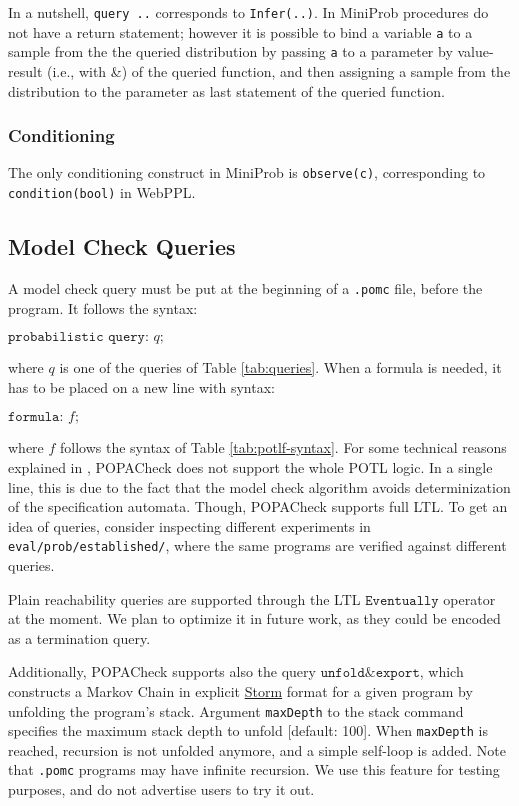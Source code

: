 \documentclass[9pt,a4paper]{article}
\begin{document}
In a nutshell, \texttt{query ..} corresponds to \texttt{Infer(..)}. In MiniProb procedures do not 
have a return statement; however it is possible to bind a variable \texttt{a} to a sample from the the queried distribution
by passing \texttt{a} to a parameter by value-result (i.e., with \&) of the queried function, 
and then assigning a sample from the distribution to the parameter as last statement of the queried function.

\subsubsection{Conditioning}
The only conditioning construct in MiniProb is \texttt{observe(c)}, corresponding to \texttt{condition(bool)} in WebPPL.

\subsection{Model Check Queries}
\label{sec:queries}
A model check query must be put at the beginning of a \verb|.pomc| file, before the program. It follows the syntax: 
\begin{center}
    $\texttt{probabilistic query:} \, \, q \texttt{;}$
\end{center}
where $q$ is one of the queries of Table \ref{tab:queries}. When a formula is needed, it has to be placed on a new line with syntax:
\begin{center}
    $\texttt{formula:} \, \, f \texttt{;}$
\end{center}
where $f$ follows the syntax of Table \ref{tab:potlf-syntax}. For some technical reasons explained in \cite{abs-2404-03515}, POPACheck does not support the whole POTL logic. In a single line, this is due to the fact that the model check algorithm avoids determinization of the specification automata. Though, POPACheck supports full LTL. To get an idea of queries, consider inspecting different experiments in \verb|eval/prob/established/|, where the same programs are verified against different queries.

Plain reachability queries are supported through the LTL $\texttt{Eventually}$ operator at the moment. We plan to optimize it in future work, as they could be encoded as a termination query. 

Additionally, POPACheck supports also the query $\texttt{unfold\&export}$, which constructs a Markov Chain in explicit \href{https://www.stormchecker.org/documentation/background/languages.html}{Storm} format for a given program by unfolding the program's stack. Argument \verb|maxDepth| to the stack command specifies the maximum stack depth to unfold [default: 100]. When \verb|maxDepth| is reached, recursion is not unfolded anymore, and a simple self-loop is added. Note that \verb|.pomc| programs may have infinite recursion. We use this feature for testing purposes, and do not advertise users to try it out.
\end{document}
